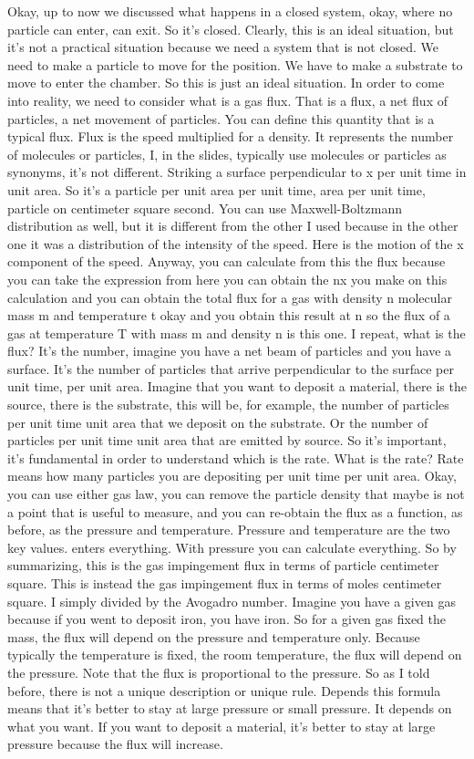 Okay, up to now we discussed what happens in a closed system, okay, where no particle can enter, can exit. So it's closed. Clearly, this is an ideal situation, but it's not a practical situation because we need a system that is not closed. We need to make a particle to move for the position. We have to make a substrate to move to enter the chamber. So this is just an ideal situation. In order to come into reality, we need to consider what is a gas flux. That is a flux, a net flux of particles, a net movement of particles. You can define this quantity that is a typical flux. Flux is the speed multiplied for a density. It represents the number of molecules or particles, I, in the slides, typically use molecules or particles as synonyms, it's not different. Striking a surface perpendicular to x per unit time in unit area. So it's a particle per unit area per unit time, area per unit time, particle on centimeter square second. You can use Maxwell-Boltzmann distribution as well, but it is different from the other I used because in the other one it was a distribution of the intensity of the speed. Here is the motion of the x component of the speed. Anyway, you can calculate from this the flux because you can take the expression from here you can obtain the nx you make on this calculation and you can obtain the total flux for a gas with density n molecular mass m and temperature t okay and you obtain this result at n so the flux of a gas at temperature T with mass m and density n is this one. I repeat, what is the flux? It's the number, imagine you have a net beam of particles and you have a surface. It's the number of particles that arrive perpendicular to the surface per unit time, per unit area. Imagine that you want to deposit a material, there is the source, there is the substrate, this will be, for example, the number of particles per unit time unit area that we deposit on the substrate. Or the number of particles per unit time unit area that are emitted by source. So it's important, it's fundamental in order to understand which is the rate. What is the rate? Rate means how many particles you are depositing per unit time per unit area. Okay, you can use either gas law, you can remove the particle density that maybe is not a point that is useful to measure, and you can re-obtain the flux as a function, as before, as the pressure and temperature. Pressure and temperature are the two key values. enters everything. With pressure you can calculate everything. So by summarizing, this is the gas impingement flux in terms of particle centimeter square. This is instead the gas impingement flux in terms of moles centimeter square. I simply divided by the Avogadro number. Imagine you have a given gas because if you went to deposit iron, you have iron. So for a given gas fixed the mass, the flux will depend on the pressure and temperature only. Because typically the temperature is fixed, the room temperature, the flux will depend on the pressure. Note that the flux is proportional to the pressure. So as I told before, there is not a unique description or unique rule. Depends this formula means that it's better to stay at large pressure or small pressure. It depends on what you want. If you want to deposit a material, it's better to stay at large pressure because the flux will increase. 